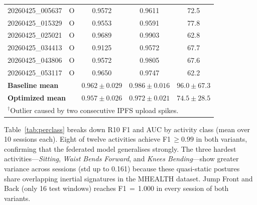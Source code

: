 \documentclass{llncs}
\begin{document}
\begin{table}[t]
\begin{tabular}{llccc}
20260425\_005637 & O & 0.9572 & 0.9611 & \phantom{0}72.5 \\
20260425\_015329 & O & 0.9553 & 0.9591 & \phantom{0}77.8 \\
20260425\_025021 & O & 0.9689 & 0.9903 & \phantom{0}62.8 \\
20260425\_034413 & O & 0.9125 & 0.9572 & \phantom{0}67.7 \\
20260425\_043806 & O & 0.9572 & 0.9805 & \phantom{0}67.6 \\
20260425\_053117 & O & 0.9650 & 0.9747 & \phantom{0}62.2 \\
\midrule
\multicolumn{2}{l}{\textbf{Baseline mean}} & $0.962{\pm}0.029$ & $0.986{\pm}0.016$ & $\mathbf{96.0{\pm}67.3}$ \\
\multicolumn{2}{l}{\textbf{Optimized mean}} & $0.957{\pm}0.026$ & $0.972{\pm}0.021$ & $\mathbf{74.5{\pm}28.5}$ \\
\bottomrule
\multicolumn{5}{l}{$^{\dagger}$Outlier caused by two consecutive IPFS upload spikes.}
\end{tabular}
\end{table}

Table~\ref{tab:perclass} breaks down R10 F1 and AUC by activity class
(mean over 10 sessions each). Eight of twelve activities achieve
F1\,$\geq\!0.99$ in both variants, confirming that the federated model
generalises strongly. The three hardest activities---\textit{Sitting},
\textit{Waist Bends Forward}, and \textit{Knees Bending}---show greater
variance across sessions (std up to 0.161) because these quasi-static
postures share overlapping inertial signatures in the MHEALTH dataset.
Jump Front and Back (only 16 test windows) reaches F1\,$=$\,1.000
in every session of both variants.
\end{document}
